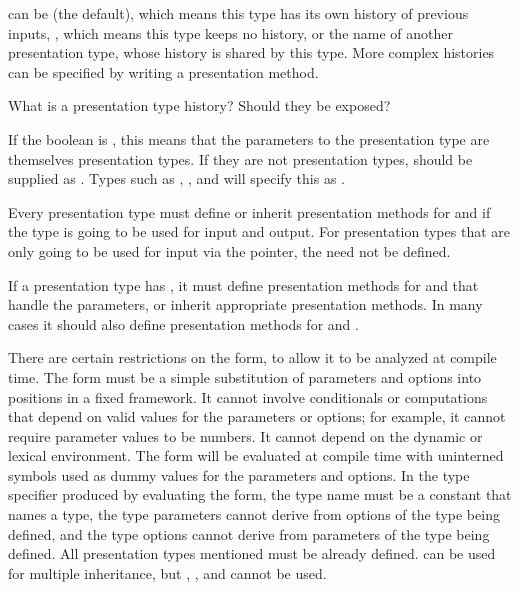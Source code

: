  can be  (the default), which means this type has its own
history of previous inputs, , which means this type keeps no history,
or the name of another presentation type, whose history is shared by this
type.  More complex histories can be specified by writing a
 presentation method.

 {What is a presentation type history?  Should they be exposed?}

If the boolean  is , this means that the
parameters to the presentation type are themselves presentation types.  If they
are not presentation types,  should be supplied as
.  Types such as , , and  will specify
this as .

Every presentation type must define or inherit presentation methods for
 and  if the type is going to be used for input and
output.  For presentation types that are only going to be used for input via the
pointer, the  need not be defined.

If a presentation type has , it must define presentation methods
for  and  that handle the
parameters, or inherit appropriate presentation methods.  In many cases it
should also define presentation methods for  and
.

There are certain restrictions on the  form, to allow it to be
analyzed at compile time.  The form must be a simple substitution of parameters
and options into positions in a fixed framework.  It cannot involve conditionals
or computations that depend on valid values for the parameters or options; for
example, it cannot require parameter values to be numbers.  It cannot depend on
the dynamic or lexical environment.  The form will be evaluated at compile time
with uninterned symbols used as dummy values for the parameters and options.  In
the type specifier produced by evaluating the form, the type name must be a
constant that names a type, the type parameters cannot derive from options of
the type being defined, and the type options cannot derive from parameters of
the type being defined.  All presentation types mentioned must be already
defined.   can be used for multiple inheritance, but , ,
and  cannot be used.

